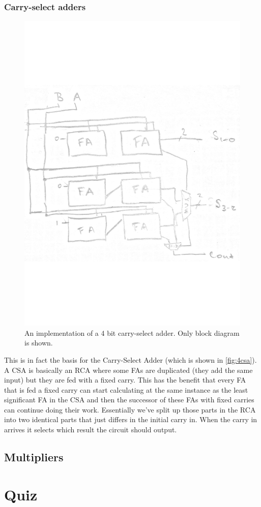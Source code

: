 \documentclass[a4paper,11pt]{report}
\begin{document}
\subsection{Carry-select adders}

\begin{figure}[H]
  \centering
  \includegraphics[width=.7\textwidth, trim={0 5cm 0 5cm}]{images/4b-CSA.pdf}
  \caption{An implementation of a 4 bit carry-select adder. Only block diagram is shown.}
  \label{fig:4csa}
\end{figure}

This is in fact the basis for the Carry-Select Adder (which is shown
in \autoref{fig:4csa}). A CSA is basically an RCA where some FAs are
duplicated (they add the same input) but they are fed with a fixed
carry. This has the benefit that every FA that is fed a fixed carry
can start calculating at the same instance as the least significant FA
in the CSA and then the successor of these FAs with fixed carries can
continue doing their work. Essentially we've split up those parts in
the RCA into two identical parts that just differs in the initial
carry in. When the carry in arrives it selects which result the
circuit should output.

\section{Multipliers}

\chapter{Quiz}
\end{document}
